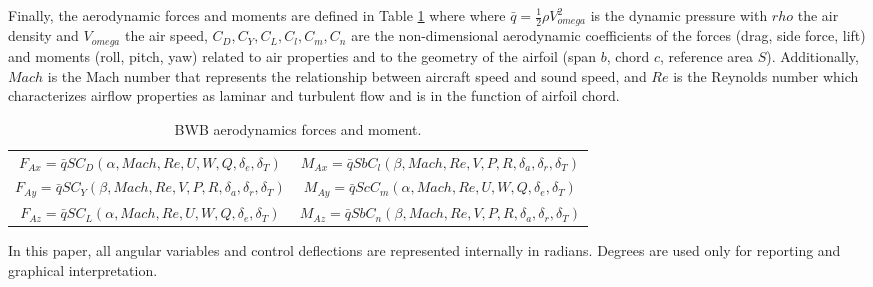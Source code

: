 \documentclass[10pt]{article}
\begin{document}
Finally, the aerodynamic forces and moments are defined in Table \ref{tab:aerodynamics} where where $\bar{q}=\frac{1}{2}\rho V_{omega}^2$ is the dynamic pressure with $rho$ the air
density and $V_{omega}$ the air speed, 
$C_{D},C_{Y}, C_{L}, C_{l}, C_{m}, C_{n} $ are the non-dimensional aerodynamic coefficients of the forces (drag, side force, lift) and moments (roll, pitch, yaw) related to air properties and to the geometry of the airfoil (span $b$, chord $c$, reference area $S$). Additionally, $Mach$ is the Mach number that represents the relationship between aircraft speed and sound speed, and $Re$ is the Reynolds number which characterizes airflow properties as laminar and turbulent flow and is in the function of airfoil chord.
%
\begin{table}
    \centering
    \caption{BWB aerodynamics forces and moment.}
    \begin{tabular}{c |c}
    \hline
        $F_{Ax} = \bar{q} S C_{D} (\alpha, Mach, Re,U,W,Q, \delta_{e}, \delta_{T})$ & $M_{Ax} = \bar{q} S b C_{l} (\beta, Mach, Re,V, P, R, \delta_{a}, \delta_{r}, \delta_{T})$\\
        $F_{Ay} = \bar{q} S C_{Y} (\beta, Mach, Re,V, P, R, \delta_{a},\delta_{r}, \delta_{T})$ & $M_{Ay} = \bar{q} S c C_{m} (\alpha, Mach, Re,U,W,Q, \delta_{e}, \delta_{T})$\\
        $F_{Az} = \bar{q} S C_{L} (\alpha, Mach, Re,U,W, Q, \delta_{e},  \delta_{T} )$ & $M_{Az} = \bar{q} S b C_{n} (\beta, Mach, Re,V, P, R, \delta_{a}, \delta_{r}, \delta_{T})$\\
        \hline
    \end{tabular}
    \label{tab:aerodynamics}
\end{table} 
%

In this paper, all angular variables and control deflections are
represented internally in radians. Degrees are used only for reporting
and graphical interpretation.
\end{document}
